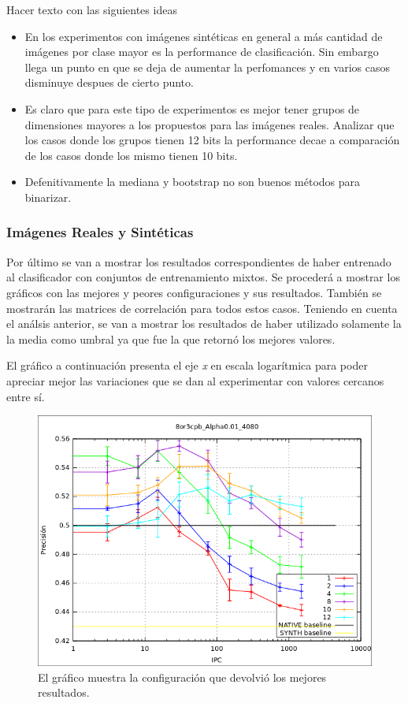 	Hacer texto con las siguientes ideas
	\begin{itemize}
		\item En los experimentos con imágenes sintéticas en general a más cantidad de imágenes por clase mayor es la performance de clasificación. Sin embargo llega un punto en que se deja de aumentar la perfomances y en varios casos disminuye despues de cierto punto.
		\item Es claro que para este tipo de experimentos es mejor tener grupos de dimensiones mayores a los propuestos para las imágenes reales. Analizar que los casos donde los grupos tienen 12 bits la performance decae a comparación de los casos donde los mismo tienen 10 bits.
		\item Defenitivamente la mediana y bootstrap no son buenos métodos para binarizar.
	\end{itemize}
			
\newpage
    	\subsubsection{Imágenes Reales y Sintéticas}
    	
	Por último se van a mostrar los resultados correspondientes de haber entrenado al clasificador con conjuntos de entrenamiento mixtos. Se procederá a mostrar los gráficos con las mejores y peores configuraciones y sus resultados. También se mostrarán las matrices de correlación para todos estos casos. Teniendo en cuenta el análsis anterior, se van a mostrar los resultados de haber utilizado solamente la la media como umbral ya que fue la que retornó los mejores valores.
	
	El gráfico a continuación presenta el eje \textit{x} en escala logarítmica para poder apreciar mejor las variaciones que se dan al experimentar con valores cercanos entre sí.
	
			\begin{figure}[!htbp]
				\centering
				\includegraphics[scale=0.6]{img/resultados/mixtas/best_mean.png}
				\caption[Mixtas media mejor resultado]{El gráfico muestra la configuración que devolvió los mejores resultados.}
				\label{fig: Mixtas-media-mejor}
			\end{figure}

